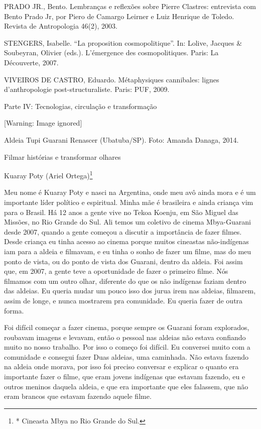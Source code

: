 \documentclass{article}
\begin{document}
PRADO JR., Bento. Lembran\c{c}as e reflex\~oes sobre Pierre Clastres:
entrevista com Bento Prado Jr, por Piero de Camargo Leirner e Luiz
Henrique de Toledo. Revista de Antropologia 46(2), 2003.  

STENGERS, Isabelle. {\textquotedblleft}La proposition
cosmopolitique{\textquotedblright}. In: Lolive, Jacques \& Soubeyran,
Olivier (eds.). L{\textquoteright}\'emergence des cosmopolitiques.
Paris: La D\'ecouverte, 2007.

VIVEIROS DE CASTRO, Eduardo. M\'etaphysiques cannibales: lignes
d{\textquoteright}anthropologie post-structuraliste. Paris: PUF, 2009.

Parte IV: Tecnologias, circula\c{c}\~ao e transforma\c{c}\~ao

  [Warning: Image ignored] %
 

Aldeia Tupi Guarani Renascer (Ubatuba/SP). Foto: Amanda Danaga, 2014.

Filmar hist\'orias e transformar olhares

Kuaray Poty (Ariel Ortega)\footnote{* Cineasta Mbya no Rio Grande do
Sul.}

Meu nome \'e Kuaray Poty e nasci na Argentina, onde meu av\^o ainda mora
e \'e um importante l\'ider pol\'itico e espiritual. Minha m\~ae \'e
brasileira e ainda crian\c{c}a vim para o Brasil. H\'a 12 anos a gente
vive no Tekoa Koenju, em S\~ao Miguel das Miss\~oes, no Rio Grande do
Sul. Ali temos um coletivo de cinema Mbya-Guarani desde 2007, quando a
gente come\c{c}ou a discutir a import\^ancia de fazer filmes. Desde
crian\c{c}a eu tinha acesso ao cinema porque muitos cineastas
n\~ao-ind\'igenas iam para a aldeia e filmavam, e eu tinha o sonho de
fazer um filme, mas do meu ponto de vista, ou do ponto de vista dos
Guarani, dentro da aldeia. Foi assim que, em 2007, a gente teve a
oportunidade de fazer o primeiro filme. N\'os filmamos com um outro
olhar, diferente do que os n\~ao ind\'igenas faziam dentro das aldeias.
Eu queria mudar um pouco isso dos jurua irem nas aldeias, filmarem,
assim de longe, e nunca mostrarem pra comunidade. Eu queria fazer de
outra forma. 

Foi dif\'icil come\c{c}ar a fazer cinema, porque sempre os Guarani foram
explorados, roubavam imagens e levavam, ent\~ao o pessoal nas aldeias
n\~ao estava confiando muito no nosso trabalho. Por isso o come\c{c}o
foi dif\'icil. Eu conversei muito com a comunidade e consegui fazer
Duas aldeias, uma caminhada. N\~ao estava fazendo na aldeia onde
morava, por isso foi preciso conversar e explicar o quanto era
importante fazer o filme, que eram jovens ind\'igenas que estavam
fazendo, eu e outros meninos daquela aldeia, e que era importante que
eles falassem, que n\~ao eram brancos que estavam fazendo aquele filme.
\end{document}
